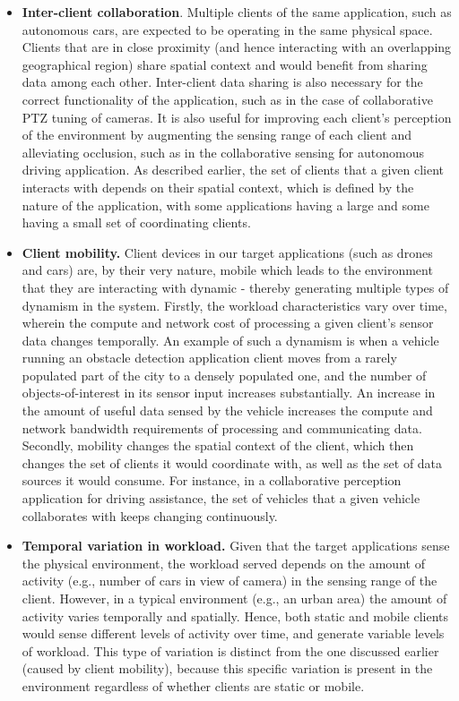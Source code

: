 \begin{itemize}
\item \textbf{Inter-client collaboration}. Multiple clients of the same application, such as autonomous cars, are expected to be operating in the same physical space. Clients that are in close proximity (and hence interacting with an overlapping geographical region) share spatial context and would benefit from sharing data among each other. Inter-client data sharing is also necessary for the correct functionality of the application, such as in the case of collaborative PTZ tuning of cameras. It is also useful for improving each client's perception of the environment by augmenting the sensing range of each client and alleviating occlusion, such as in the collaborative sensing for autonomous driving application. As described earlier, the set of clients that a given client interacts with depends on their spatial context, which is defined by the nature of the application, with some applications having a large and some having a small set of coordinating clients.

\item \textbf{Client mobility.} Client devices in our target applications (such as drones and cars) are, by their very nature, mobile which leads to the environment that they are interacting with dynamic - thereby  generating multiple types of dynamism in the system. Firstly, the workload characteristics vary over time, wherein the compute and network cost of processing a given client's sensor data changes temporally. An example of such a dynamism is when a vehicle running an obstacle detection application client moves from a rarely populated part of the city to a densely populated one, and the number of objects-of-interest in its sensor input increases substantially. An increase in the amount of useful data sensed by the vehicle increases the compute and network bandwidth requirements of processing and communicating data. Secondly, mobility changes the spatial context of the client, which then changes the set of clients it would coordinate with, as well as the set of data sources it would consume. For instance, in a collaborative perception application for driving assistance, the set of vehicles that a given vehicle collaborates with keeps changing continuously.

\item \textbf{Temporal variation in workload.} Given that the target applications sense the physical environment, the workload served depends on the amount of activity (e.g., number of cars in view of camera) in the sensing range of the client. However, in a typical environment (e.g., an urban area) the amount of activity varies temporally and spatially. Hence, both static and mobile clients would sense different levels of activity over time, and generate variable levels of workload. This type of variation is distinct from the one discussed earlier (caused by client mobility), because this specific variation is present in the environment regardless of whether clients are static or mobile.
\end{itemize}

